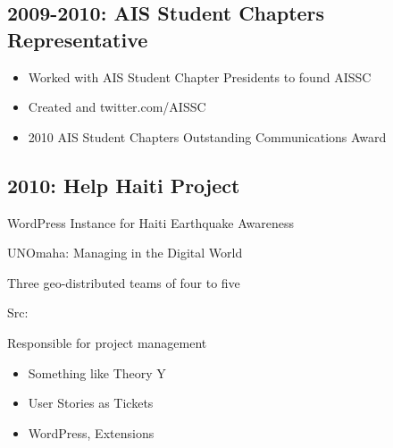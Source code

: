 \documentclass[letter,,openany,oneside,english]{sphinxhowto}
\begin{document}
\subsection{2009-2010: AIS Student Chapters Representative}
\label{\detokenize{resume:ais-student-chapters-representative}}
\begin{DUlineblock}{0em}
\item[] 
\end{DUlineblock}
\begin{itemize}
\item {} 
Worked with AIS Student Chapter Presidents to found AISSC

\item {} 
Created  and
twitter.com/AISSC

\item {} 
2010 AIS Student Chapters Outstanding Communications Award

\end{itemize}


\subsection{2010: Help Haiti Project}
\label{\detokenize{resume:help-haiti-project}}
\begin{DUlineblock}{0em}
\item[] WordPress Instance for Haiti Earthquake Awareness
\item[] UNOmaha: Managing in the Digital World
\item[] Three geo-distributed teams of four to five
\item[] Src: 
\end{DUlineblock}

Responsible for project management
\begin{itemize}
\item {} 
Something like Theory Y

\item {} 
User Stories as Tickets

\item {} 
WordPress, Extensions

\end{itemize}
\end{document}
